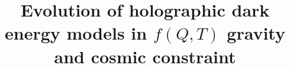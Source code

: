 \documentclass[linenumbers]{aastex631}
\begin{document}
\title{Evolution of  holographic dark energy models in $f(Q,T)$ gravity and cosmic constraint}


\end{document}
